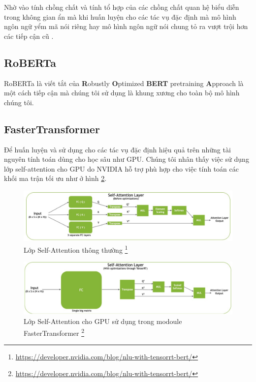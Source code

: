 \documentclass[10pt, conference, a4paper, compsocconf]{IEEEtran}
\begin{document}
Nhờ vào tính chồng chất và tính tổ hợp của các chồng chất quan hệ biểu diễn trong không gian ẩn mà khi huấn luyện cho các tác vụ đặc định mà mô hình ngôn ngữ yểm mã nói riêng hay 
mô hình ngôn ngữ nói chung tỏ ra vượt trội hơn các tiếp cận cũ \cite{Nguyen2020}.
\subsection{RoBERTa}
RoBERTa\cite{Liu2019} là viết tắt của \textbf{R}obustly \textbf{O}ptimized \textbf{BERT} pretraining \textbf{A}pproach 
là một cách tiếp cận mà chúng tôi sử dụng là khung xương cho toàn bộ mô hình chúng tôi.

\subsection{FasterTransformer}
Để huấn luyện và sử dụng cho các tác vụ đặc định hiệu quả trên những tài nguyên tính toán dùng cho học sâu như GPU.
Chúng tôi nhân thấy việc sử dụng lớp self-attention cho GPU do NVIDIA hỗ trợ phù hợp cho việc tính toán các khối ma trận tối ưu như ở hình \ref{fig:self-attn-5}.
\begin{figure}[]
  \centering
  \includegraphics[width=\linewidth]{Image/self_attn_layer_before.jpg}
  \caption[caption]{Lớp Self-Attention thông thường
  \footnote{\url{https://developer.nvidia.com/blog/nlu-with-tensorrt-bert/}}}
  \label{fig:self-attn-4}
\end{figure}

\begin{figure}[hbt!]
  \centering
  \includegraphics[width=\linewidth]{Image/self_attn_layer.jpg}
  \caption[caption]{Lớp Self-Attention cho GPU sử dụng trong modoule FasterTransformer
  \footnote{\url{https://developer.nvidia.com/blog/nlu-with-tensorrt-bert/}}}
  \label{fig:self-attn-5}
\end{figure}
\end{document}
